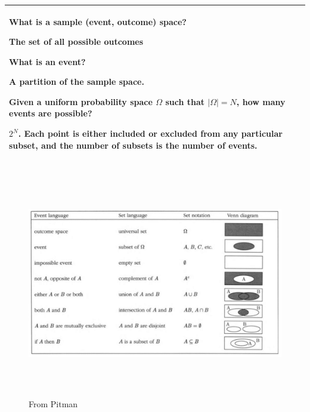 {\tabulinesep=1mm
\begin{tabu}{|p{16cm} |}
\hline
\vspace{2 mm}
\begin{questions}
\item What is a sample (event, outcome) space?
\begin{solution}[1.5 cm]
The set of all possible outcomes
\end{solution}

\item What is an event?
\begin{solution}[1.5 cm]
A partition of the sample space.
\end{solution}

\item Given a uniform probability space $\Omega$ such that 
$|\Omega| = N$, how many events are possible?
\begin{solution}[1.5 cm]
$2^N$. Each point is either included or excluded from any particular 
subset, and the number of subsets is the number of events.
\end{solution}

\end{questions}
\\
\hline
\end{tabu}
}

\begin{figure}[!ht]
\caption{From Pitman}
\includegraphics[width=17cm, height=10cm]{intro.jpg}
\end{figure}